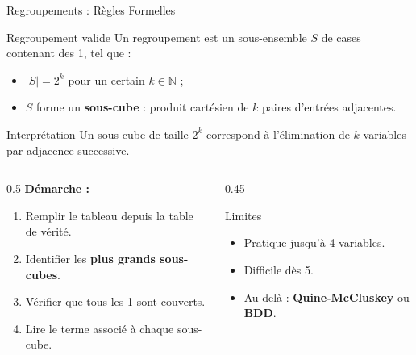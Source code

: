 \begin{frame}{Regroupements : Règles Formelles}

    \begin{block}{Regroupement valide}
        Un regroupement est un sous-ensemble \(S\) de cases contenant des 1, tel que :
        \begin{itemize}
            \item \(|S| = 2^k\) pour un certain \(k \in \mathbb{N}\) ;
            \item \(S\) forme un \textbf{sous-cube} : produit cartésien de \(k\) paires d'entrées adjacentes.
        \end{itemize}
    \end{block}

    \vspace{0.3cm}

    \begin{alertblock}{Interprétation}
        Un sous-cube de taille \(2^k\) correspond à l'élimination de \(k\) variables par adjacence successive.
    \end{alertblock}

    \vspace{0.3cm}

    \begin{columns}[T]
        \begin{column}{0.5\textwidth}
            \textbf{Démarche :}
            \begin{enumerate}
                \item Remplir le tableau depuis la table de vérité.
                \item Identifier les \textbf{plus grands sous-cubes}.
                \item Vérifier que tous les 1 sont couverts.
                \item Lire le terme associé à chaque sous-cube.
            \end{enumerate}
        \end{column}
        \begin{column}{0.45\textwidth}
            \begin{exampleblock}{Limites}
                \begin{itemize}
                    \item Pratique jusqu'à 4 variables.
                    \item Difficile dès 5.
                    \item Au-delà : \textbf{Quine-McCluskey} ou \textbf{BDD}.
                \end{itemize}
            \end{exampleblock}
        \end{column}
    \end{columns}
\end{frame}
